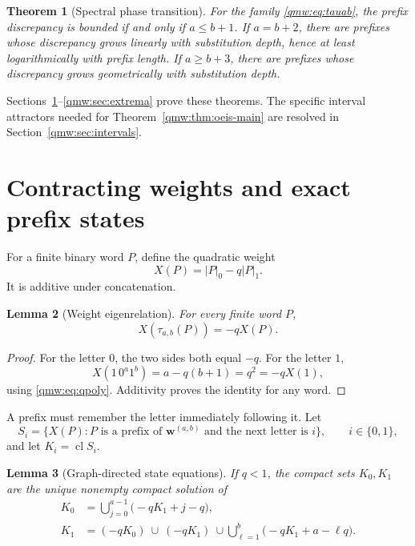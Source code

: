 \documentclass[11pt]{article}
\numberwithin{equation}{section}
\newtheorem{theorem}{Theorem}[section]
\newtheorem{lemma}[theorem]{Lemma}
\theoremstyle{definition}
\theoremstyle{remark}
\newcommand{\cl}{\operatorname{cl}}
\newcommand{\word}{\mathbf{w}}
\newcommand{\ones}[1]{\lvert#1\rvert_1}
\newcommand{\zeros}[1]{\lvert#1\rvert_0}
\begin{document}
\begin{theorem}[Spectral phase transition]\label{qmw:thm:phase}
For the family \eqref{qmw:eq:tauab}, the prefix discrepancy is bounded if and
only if $a\leq b+1$.  If $a=b+2$, there are prefixes whose discrepancy grows
linearly with substitution depth, hence at least logarithmically with prefix
length.  If $a\geq b+3$, there are prefixes whose discrepancy grows
geometrically with substitution depth.
\end{theorem}

Sections~\ref{qmw:sec:states}--\ref{qmw:sec:extrema} prove these theorems.  The
specific interval attractors needed for Theorem~\ref{qmw:thm:oeis-main} are
resolved in Section~\ref{qmw:sec:intervals}.

\section{Contracting weights and exact prefix states}\label{qmw:sec:states}

For a finite binary word $P$, define the quadratic weight
\begin{equation}\label{qmw:eq:weight}
X(P)=\zeros{P}-q\ones{P}.
\end{equation}
It is additive under concatenation.

\begin{lemma}[Weight eigenrelation]\label{qmw:lem:weight}
For every finite word $P$,
\begin{equation}\label{qmw:eq:contraction}
X(\tau_{a,b}(P))=-qX(P).
\end{equation}
\end{lemma}

\begin{proof}
For the letter $0$, the two sides both equal $-q$.  For the letter $1$,
\[
X(1\,0^a1^b)=a-q(b+1)=q^2=-qX(1),
\]
using \eqref{qmw:eq:qpoly}.  Additivity proves the identity for any word.
\end{proof}

A prefix must remember the letter immediately following it.  Let
\begin{equation}\label{qmw:eq:states}
S_i=\{X(P):P\text{ is a prefix of }\word^{(a,b)}
\text{ and the next letter is }i\},
\qquad i\in\{0,1\},
\end{equation}
and let $K_i=\cl S_i$.

\begin{lemma}[Graph-directed state equations]\label{qmw:lem:state-equations}
If $q<1$, the compact sets $K_0,K_1$ are the unique nonempty compact solution
of
\begin{align}
K_0&=\bigcup_{j=0}^{a-1}\bigl(-qK_1+j-q\bigr),
\label{qmw:eq:K0}\\
K_1&=(-qK_0)\ \cup\ (-qK_1)\ \cup\!
\bigcup_{\ell=1}^{b}\bigl(-qK_1+a-\ell q\bigr).
\label{qmw:eq:K1}
\end{align}
\end{lemma}
\end{document}
